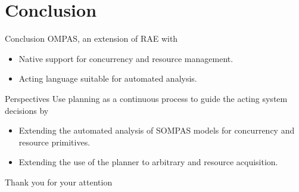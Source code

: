 \section{Conclusion}
\begin{frame}[c]{Conclusion}
    OMPAS, an extension of RAE with
    \begin{itemize}
        \pause
        \item Native support for concurrency and resource management.
        \pause
        \item Acting language suitable for automated analysis.
    \end{itemize}    
\end{frame}

\begin{frame}[c]{Perspectives}
    Use planning as a continuous process to guide the acting system decisions by
    \begin{itemize}
        \pause
        \item Extending the automated analysis of SOMPAS models \cite{turiGuidanceRefinementbasedActing2022} for concurrency and resource primitives.
        \pause
        \item Extending the use of the planner to arbitrary and resource acquisition.
    \end{itemize}
\end{frame}

\begin{frame}
    \LARGE
    \centering
    Thank you for your attention
\end{frame}


